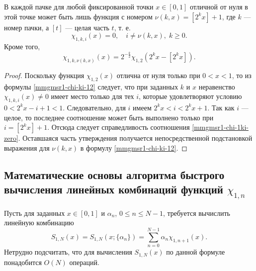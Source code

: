 \begin{statement}\label{mmgmsr1-st-one-in-pack}
	В каждой пачке для любой фиксированной точки $x \in [0,1]$ отличной от нуля в этой точке может быть лишь функция с номером $\nu(k,x)=[2^kx]+1$, где $k$ --- номер пачки, а $[t]$ --- целая часть $t$, т. е.
	\begin{equation}\label{mmgmsr1-chi-1ki-zero}
	\chi_{1,k,i}(x)=0, \quad i \ne \nu(k,x), \; k \ge 0.
	\end{equation}
	Кроме того,
	\begin{equation}\label{mmgmsr1-chi-1knu}
	\chi_{1,k,\nu(k,x)}(x)=2^{-\frac{k}{2}}\chi_{1,2}(2^kx-[2^kx]).
	\end{equation}
\end{statement}
\begin{proof}
	Поскольку функция $\chi_{1,2}(x)$ отлична от нуля только при $0 < x < 1$, то из формулы \eqref{mmgmsr1-chi-ki-12} следует, что при заданных $k$ и $x$ неравенство $\chi_{1,k,i}(x) \ne 0$ имеет место только для тех $i$, которые удовлетворяют условию $0 < 2^kx-i+1 < 1$. Следовательно, для $i$ имеем  $2^kx < i < 2^kx+1$. Так как $i$ --- целое, то последнее соотношение может быть выполнено только при $i=[2^kx]+1$. Отсюда следует справедливость соотношения \eqref{mmgmsr1-chi-1ki-zero}. Оставшаяся часть утверждения получается непосредственной подстановкой выражения для $\nu(k,x)$ в формулу \eqref{mmgmsr1-chi-ki-12}.
\end{proof}

\subsection{Математические основы алгоритма быстрого вычисления линейных комбинаций функций $\chi_{1,n}$}

Пусть для заданных $x\in[0,1]$ и $\alpha_n$, $0 \le n \le N-1$, требуется вычислить линейную комбинацию
\begin{equation}\label{mmgmsr1-linear-comb-chi}
S_{1,N}(x)=S_{1,N}(x; \{\alpha_n\})=
\sum\limits_{n=0}^{N-1}
\alpha_n \chi_{1,n+1}(x).
\end{equation}
Нетрудно подсчитать, что для вычисления $S_{1,N}(x)$ по данной формуле понадобится $O(N)$ операций.
%

